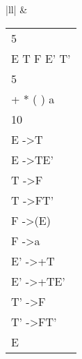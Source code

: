 \begin{table}[h!]
\begin{tabular}{|ll|}
                                                                                                        & \begin{tabular}[c]{@{}l@{}}5\\ E T F E' T'\\ 5\\ + * ( ) a\\ 10\\ E -\textgreater T\\ E -\textgreater TE'\\ T -\textgreater F\\ T -\textgreater FT'\\ F -\textgreater (E)\\ F -\textgreater a\\ E' -\textgreater +T\\ E' -\textgreater +TE'\\ T' -\textgreater *F\\ T' -\textgreater *FT'\\ E\end{tabular}                                                                                                                                                                                                                            \\ \hline
    \end{tabular}
    \end{table}

